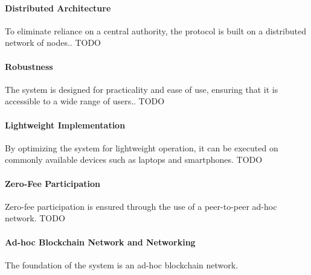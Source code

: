 \documentclass{article}
\begin{document}
\paragraph{Distributed Architecture}
To eliminate reliance on a central authority, the protocol is built on a distributed network of nodes.. TODO

\paragraph{Robustness}
The system is designed for practicality and ease of use, ensuring that it is accessible to a wide range of users.. TODO

\paragraph{Lightweight Implementation}
By optimizing the system for lightweight operation, it can be executed on commonly available devices such as laptops and smartphones. TODO

\paragraph{Zero-Fee Participation}
Zero-fee participation is ensured through the use of a peer-to-peer ad-hoc network. TODO

\paragraph{Ad-hoc Blockchain Network and Networking}
The foundation of the system is an ad-hoc blockchain network.


\newcommand{\PartySecretKey}[1]{\ensuremath{s_{#1}}}
\newcommand{\Party}[1]{\ensuremath{P_{#1}}}

\newcommand{\EncryptionKey}{\textbf{E}}
\newcommand{\DecryptionKey}{\textbf{d}}

\newcommand{\PartialDecryptionKey}[1]{\ensuremath{d_{#1}}}
\newcommand{\PartialEncryptionKey}[1]{\ensuremath{E_{#1}}}

\newcommand{\EncryptedPartialDecryptionKeyShare}[2]{\ensuremath{C_{#1,#2}}}
\newcommand{\SetOfEncryptedPartialDecryptionKeys}{\ensuremath{\mathbb{C}}}
\newcommand{\SetOfFDKG}{\ensuremath{\mathbb{D}}}
\newcommand{\SetOfSharesOfPartialDecryption}{\ensuremath{\mathbb{C}}}

\newcommand{\IthDecryptionKey}[1]{\ensuremath{d_{#1}}}
\newcommand{\IthEncryptionKey}[1]{E_{#1}}
\end{document}
